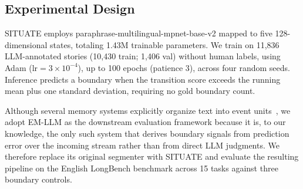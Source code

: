 \documentclass[11pt]{article}
\begin{document}
\subsection{Experimental Design}
SITUATE employs paraphrase-multilingual-mpnet-base-v2 mapped to five 128-dimensional states, totaling 1.43M trainable parameters. We train on 11,836 LLM-annotated stories (10,430 train; 1,406 val) without human labels, using Adam ($\text{lr}=3\times10^{-4}$), up to 100 epochs (patience 3), across four random seeds. Inference predicts a boundary when the transition score exceeds the running mean plus one standard deviation, requiring no gold boundary count.

Although several memory systems explicitly organize text into event units~\citep{hu2026memory, zhong2026hingemem, zou2026mem}, we adopt EM-LLM as the downstream evaluation framework because it is, to our knowledge, the only such system that derives boundary signals from prediction error over the incoming stream rather than from direct LLM judgments. We therefore replace its original segmenter with SITUATE and evaluate the resulting pipeline on the English LongBench benchmark across 15 tasks against three boundary controls.
\end{document}
